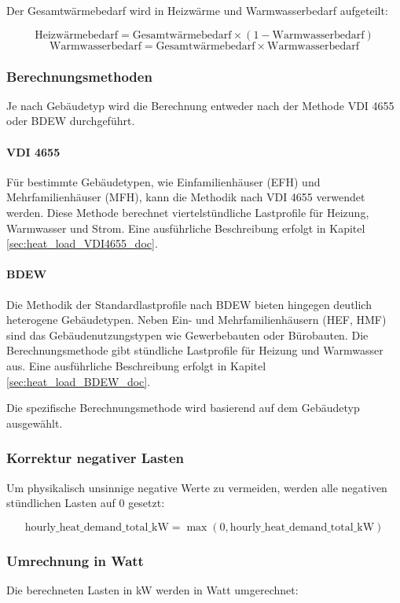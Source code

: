Der Gesamtwärmebedarf wird in Heizwärme und Warmwasserbedarf aufgeteilt:

\[
\text{Heizwärmebedarf} = \text{Gesamtwärmebedarf} \times (1 - \text{Warmwasserbedarf})
\]
\[
\text{Warmwasserbedarf} = \text{Gesamtwärmebedarf} \times \text{Warmwasserbedarf}
\]

\subsubsection{Berechnungsmethoden}
Je nach Gebäudetyp wird die Berechnung entweder nach der Methode VDI 4655 oder BDEW durchgeführt.

\paragraph{VDI 4655}
Für bestimmte Gebäudetypen, wie Einfamilienhäuser (EFH) und Mehrfamilienhäuser (MFH), kann die Methodik nach VDI 4655 verwendet werden. Diese Methode berechnet viertelstündliche Lastprofile für Heizung, Warmwasser und Strom. Eine ausführliche Beschreibung erfolgt in Kapitel \ref{sec:heat_load_VDI4655_doc}.

\paragraph{BDEW}
Die Methodik der Standardlastprofile nach BDEW bieten hingegen deutlich heterogene Gebäudetypen. Neben Ein- und Mehrfamilienhäusern (HEF, HMF) sind das Gebäudenutzungstypen wie Gewerbebauten oder Bürobauten. Die Berechnungsmethode gibt stündliche Lastprofile für Heizung und Warmwasser aus. Eine ausführliche Beschreibung erfolgt in Kapitel \ref{sec:heat_load_BDEW_doc}.

Die spezifische Berechnungsmethode wird basierend auf dem Gebäudetyp ausgewählt.

\subsubsection{Korrektur negativer Lasten}
Um physikalisch unsinnige negative Werte zu vermeiden, werden alle negativen stündlichen Lasten auf 0 gesetzt:

\[
\text{hourly\_heat\_demand\_total\_kW} = \max(0, \text{hourly\_heat\_demand\_total\_kW})
\]

\subsubsection{Umrechnung in Watt}
Die berechneten Lasten in kW werden in Watt umgerechnet:

